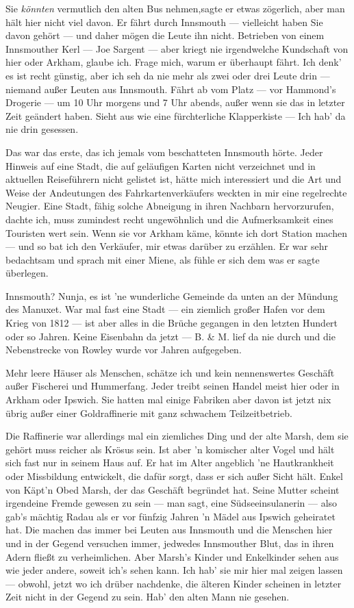\glqq Sie \textit{könnten} vermutlich den alten Bus nehmen,\grqq sagte er etwas zögerlich, \glqq aber man hält hier nicht viel davon. Er fährt durch Innsmouth --- vielleicht haben Sie davon gehört --- und daher mögen die Leute ihn nicht. Betrieben von einem Innsmouther Kerl --- Joe Sargent --- aber kriegt nie irgendwelche Kundschaft von hier oder Arkham, glaube ich. Frage mich, warum er überhaupt fährt. Ich denk' es ist recht günstig, aber ich seh da nie mehr als zwei oder drei Leute drin --- niemand außer Leuten aus Innsmouth. Fährt ab vom Platz --- vor Hammond's Drogerie --- um 10 Uhr morgens und 7 Uhr abends, außer wenn sie das in letzter Zeit geändert haben. Sieht aus wie eine fürchterliche Klapperkiste --- Ich hab' da nie drin gesessen.\grqq

Das war das erste, das ich jemals vom beschatteten Innsmouth hörte. Jeder Hinweis auf eine Stadt, die auf geläufigen Karten nicht verzeichnet und in aktuellen Reiseführern nicht gelistet ist, hätte mich interessiert und die Art und Weise der Andeutungen des Fahrkartenverkäufers weckten in mir eine regelrechte Neugier. Eine Stadt, fähig solche Abneigung in ihren Nachbarn hervorzurufen, dachte ich, muss zumindest recht ungewöhnlich und die Aufmerksamkeit eines Touristen wert sein. Wenn sie vor Arkham käme, könnte ich dort Station machen --- und so bat ich den Verkäufer, mir etwas darüber zu erzählen. Er war sehr bedachtsam und sprach mit einer Miene, als fühle er sich dem was er sagte überlegen.

\glqq Innsmouth? Nunja, es ist 'ne wunderliche Gemeinde da unten an der Mündung des Manuxet. War mal fast eine Stadt --- ein ziemlich großer Hafen vor dem Krieg von 1812 --- ist aber alles in die Brüche gegangen in den letzten Hundert oder so Jahren. Keine Eisenbahn da jetzt --- B. \& M. lief da nie durch und die Nebenstrecke von Rowley wurde vor Jahren aufgegeben.

Mehr leere Häuser als Menschen, schätze ich und kein nennenswertes Geschäft außer Fischerei und Hummerfang. Jeder treibt seinen Handel meist hier oder in Arkham oder Ipswich. Sie hatten mal einige Fabriken aber davon ist jetzt nix übrig außer einer Goldraffinerie mit ganz schwachem Teilzeitbetrieb.

Die Raffinerie war allerdings mal ein ziemliches Ding und der alte Marsh, dem sie gehört muss reicher als Krösus sein. Ist aber 'n komischer alter Vogel und hält sich fast nur in seinem Haus auf. Er hat im Alter angeblich 'ne Hautkrankheit oder Missbildung entwickelt, die dafür sorgt, dass er sich außer Sicht hält. Enkel von Käpt'n Obed Marsh, der das Geschäft begründet hat. Seine Mutter scheint irgendeine Fremde gewesen  zu sein --- man sagt, eine Südseeinsulanerin --- also gab's mächtig Radau als er vor fünfzig Jahren 'n Mädel aus Ipswich geheiratet hat. Die machen das immer bei Leuten aus Innsmouth und die Menschen hier und in der Gegend versuchen immer, jedwedes Innsmouther Blut, das in ihren Adern fließt zu verheimlichen. Aber Marsh's Kinder und Enkelkinder sehen aus wie jeder andere, soweit ich's sehen kann. Ich hab' sie mir hier mal zeigen lassen --- obwohl, jetzt wo ich drüber nachdenke, die älteren Kinder scheinen in letzter Zeit nicht in der Gegend zu sein. Hab' den alten Mann nie gesehen.

